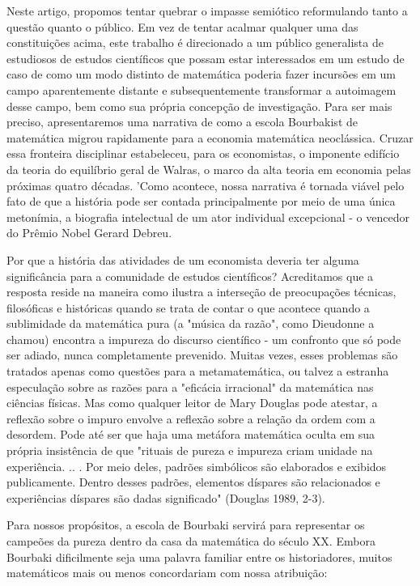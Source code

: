\documentclass[a4paper,12pt]{article}[abntex2]
\begin{document}
Neste artigo, propomos tentar quebrar o impasse semiótico reformulando tanto a questão quanto o público. Em vez de tentar acalmar qualquer uma das constituições acima, este trabalho é direcionado a um público generalista de estudiosos de estudos científicos que possam estar interessados em um estudo de caso de como um modo distinto de matemática poderia fazer incursões em um campo aparentemente distante e subsequentemente transformar a autoimagem desse campo, bem como sua própria concepção de investigação. Para ser mais preciso, apresentaremos uma narrativa de como a escola Bourbakist de matemática migrou rapidamente para a economia matemática neoclássica. Cruzar essa fronteira disciplinar estabeleceu, para os economistas, o imponente edifício da teoria do equilíbrio geral de Walras, o marco da alta teoria em economia pelas próximas quatro décadas. 'Como acontece, nossa narrativa é tornada viável pelo fato de que a história pode ser contada principalmente por meio de uma única metonímia, a biografia intelectual de um ator individual excepcional - o vencedor do Prêmio Nobel Gerard Debreu.

Por que a história das atividades de um economista deveria ter alguma significância para a comunidade de estudos científicos? Acreditamos que a resposta reside na maneira como ilustra a interseção de preocupações técnicas, filosóficas e históricas quando se trata de contar o que acontece quando a sublimidade da matemática pura (a "música da razão", como Dieudonne a chamou) encontra a impureza do discurso científico - um confronto que só pode ser adiado, nunca completamente prevenido. Muitas vezes, esses problemas são tratados apenas como questões para a metamatemática, ou talvez a estranha especulação sobre as razões para a "eficácia irracional" da matemática nas ciências físicas. Mas como qualquer leitor de Mary Douglas pode atestar, a reflexão sobre o impuro envolve a reflexão sobre a relação da ordem com a desordem. Pode até ser que haja uma metáfora matemática oculta em sua própria insistência de que "rituais de pureza e impureza criam unidade na experiência. .. . Por meio deles, padrões simbólicos são elaborados e exibidos publicamente. Dentro desses padrões, elementos díspares são relacionados e experiências díspares são dadas significado" (Douglas 1989, 2-3).

Para nossos propósitos, a escola de Bourbaki servirá para representar os campeões da pureza dentro da casa da matemática do século XX. Embora Bourbaki dificilmente seja uma palavra familiar entre os historiadores, muitos matemáticos mais ou menos concordariam com nossa atribuição:
\end{document}
